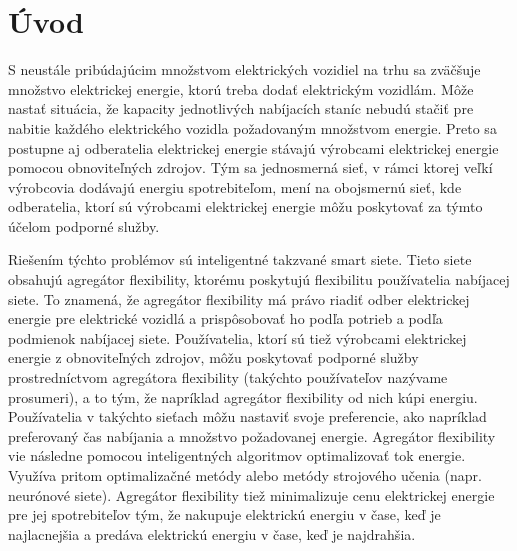 \chapter*{Úvod} %


S neustále pribúdajúcim množstvom elektrických vozidiel na trhu sa zväčšuje množstvo elektrickej energie, ktorú treba dodať elektrickým vozidlám. Môže nastať situácia, že kapacity jednotlivých nabíjacích staníc nebudú stačiť pre nabitie každého elektrického vozidla požadovaným množstvom energie. Preto sa postupne aj odberatelia elektrickej energie stávajú výrobcami elektrickej energie pomocou obnoviteľných zdrojov. Tým sa jednosmerná sieť, v rámci ktorej veľkí výrobcovia dodávajú energiu spotrebiteľom, mení na obojsmernú sieť, kde odberatelia, ktorí sú výrobcami elektrickej energie môžu poskytovať za týmto účelom podporné služby.




Riešením týchto problémov sú inteligentné takzvané smart siete. Tieto siete obsahujú agregátor flexibility, ktorému poskytujú flexibilitu používatelia nabíjacej siete. To znamená, že agregátor flexibility má právo riadiť odber elektrickej energie pre elektrické vozidlá a prispôsobovať ho podľa potrieb a podľa podmienok nabíjacej siete. Používatelia, ktorí sú tiež výrobcami elektrickej energie z obnoviteľných zdrojov, môžu poskytovať podporné služby prostredníctvom agregátora flexibility (takýchto používateľov nazývame prosumeri), a to tým, že napríklad agregátor flexibility od nich kúpi energiu.  Používatelia v takýchto sieťach môžu nastaviť svoje preferencie, ako napríklad preferovaný čas nabíjania a množstvo požadovanej energie. Agregátor flexibility vie následne pomocou inteligentných algoritmov  optimalizovať tok energie. Využíva pritom optimalizačné metódy alebo metódy strojového učenia (napr. neurónové siete). Agregátor flexibility tiež minimalizuje cenu elektrickej energie pre jej spotrebiteľov tým, že nakupuje elektrickú energiu v čase, keď je najlacnejšia a predáva elektrickú energiu v čase, keď je najdrahšia.

